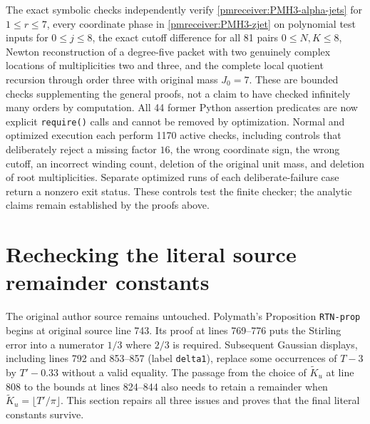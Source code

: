 \documentclass[11pt]{article}
\begin{document}
The exact symbolic checks independently verify
\eqref{pmreceiver:PMH3-alpha-jets} for $1\le r\le7$, every coordinate phase
in \eqref{pmreceiver:PMH3-zjet} on polynomial test inputs for $0\le j\le8$,
the exact cutoff difference for all 81 pairs $0\le N,K\le8$,
Newton reconstruction of a degree-five packet with two genuinely
complex locations of multiplicities two and three, and the complete
local quotient recursion through order three with original mass
$J_0=7$. These are bounded checks supplementing the general proofs,
not a claim to have checked infinitely many orders by computation.
All 44 former Python assertion predicates are now explicit
\texttt{require()} calls and cannot be removed by optimization.
Normal and optimized execution each perform 1170 active checks,
including controls that deliberately reject a missing factor $16$,
the wrong coordinate sign, the wrong cutoff, an incorrect winding
count, deletion of the original unit mass, and deletion of root
multiplicities. Separate optimized runs of each deliberate-failure
case return a nonzero exit status. These controls test the finite
checker; the analytic claims remain established by the proofs above.

\section{Rechecking the literal source remainder constants}
\label{pmreceiver:sec:source-repair}

The original author source remains untouched. Polymath's Proposition
\texttt{RTN-prop} begins at original source line 743. Its proof at
lines 769--776 puts the Stirling error into a numerator $1/3$ where
$2/3$ is required. Subsequent Gaussian displays, including lines
792 and 853--857 (label \texttt{delta1}), replace some occurrences
of $T-3$ by $T'-0.33$ without a valid equality. The passage from
the choice of $\widetilde K_u$ at line 808 to the bounds at lines
824--844 also needs to retain a remainder when
$\widetilde K_u=\lfloor T'/\pi\rfloor$. This section repairs all
three issues and proves that the final literal constants survive.
\end{document}
